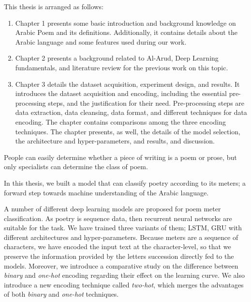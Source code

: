 \begin{spacing}{1}\end{spacing}
This thesis is arranged as follows:
\begin{enumerate}
  \item Chapter 1 presents some basic introduction and background knowledge on Arabic Poem and its definitions. Additionally, it contains details about the Arabic language and some features used during our work.
  \item Chapter 2 presents a background related to Al-Arud, Deep Learning fundamentals, and
  literature review for the previous work on this topic.
  \item Chapter 3 details the dataset acquisition, experiment design, and results. It introduces the
  dataset acquisition and encoding, including the essential pre-processing steps, and the
  justification for their need. Pre-processing steps are data extraction, data cleansing, data
  format, and different techniques for data encoding. The chapter contains comparisons among the
  three encoding techniques. The chapter presents, as well, the details of the model selection, the
  architecture and hyper-parameters, and results, and discussion.
\end{enumerate}


\begin{spacing}{1}\end{spacing}

People can easily determine whether a piece of writing is a poem or prose, but only specialists can determine the class of poem.

In this thesis, we built a model that can classify poetry according to its meters; a forward step towards machine understanding of the Arabic language.

A number of different deep learning models are proposed for poem meter classification. As poetry is sequence data, then recurrent neural networks are suitable for the task. We have trained three variants of them; LSTM, GRU with different architectures and hyper-parameters. Because meters are a sequence of characters, we have encoded the input text at the character-level, so that we preserve the information provided by the letters succession directly fed to the models. Moreover, we introduce a comparative study on the difference between \textit{binary} and \textit{one-hot} encoding regarding their effect on the learning curve. We also introduce a new encoding technique called \textit{two-hot}, which merges the advantages of both \textit{binary} and \textit{one-hot} techniques.


